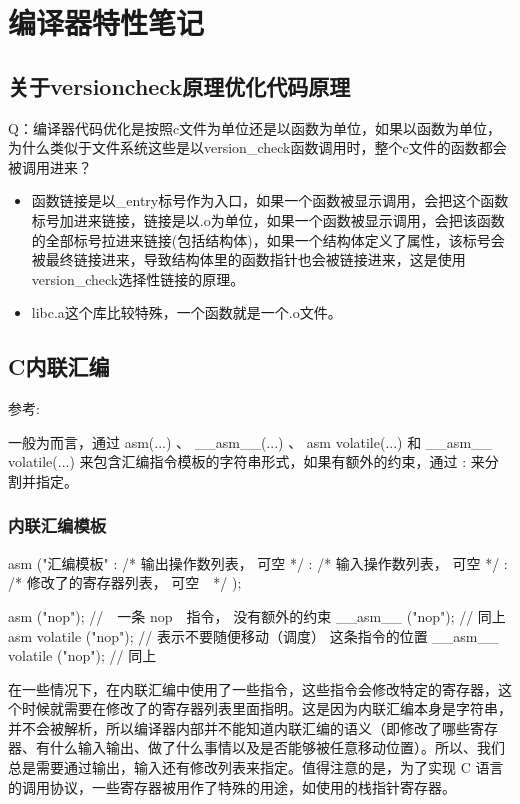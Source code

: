 \section{编译器特性笔记}
\subsection{关于versioncheck原理优化代码原理}
Q：编译器代码优化是按照c文件为单位还是以函数为单位，如果以函数为单位，为什么类似于文件系统这些是以version\_check函数调用时，整个c文件的函数都会被调用进来？
\begin{itemize}
\item 函数链接是以\_entry标号作为入口，如果一个函数被显示调用，会把这个函数标号加进来链接，链接是以.o为单位，如果一个函数被显示调用，会把该函数的全部标号拉进来链接(包括结构体)，如果一个结构体定义了属性，该标号会被最终链接进来，导致结构体里的函数指针也会被链接进来，这是使用version\_check选择性链接的原理。

\item libc.a这个库比较特殊，一个函数就是一个.o文件。


\end{itemize}

\subsection{C内联汇编}
参考: 

一般为而言，通过 asm(...) 、 \_\_asm\_\_(...) 、 asm volatile(...) 和 \_\_asm\_\_ volatile(...) 来包含汇编指令模板的字符串形式，如果有额外的约束，通过 : 来分割并指定。
\subsubsection{内联汇编模板}
\begin{myccode}
asm ("汇编模板"
 : /* 输出操作数列表， 可空 */
 : /* 输入操作数列表， 可空 */
 : /* 修改了的寄存器列表， 可空 */
 );

asm ("nop"); // 一条 nop 指令， 没有额外的约束
__asm__ ("nop"); // 同上
 asm volatile ("nop"); // 表示不要随便移动（调度） 这条指令的位置
__asm__ volatile ("nop"); // 同上
\end{myccode}

在一些情况下，在内联汇编中使用了一些指令，这些指令会修改特定的寄存器，这个时候就需要在修改了的寄存器列表里面指明。这是因为内联汇编本身是字符串，并不会被解析，所以编译器内部并不能知道内联汇编的语义（即修改了哪些寄存器、有什么输入输出、做了什么事情以及是否能够被任意移动位置）。所以、我们总是需要通过输出，输入还有修改列表来指定。值得注意的是，为了实现 C 语言的调用协议，一些寄存器被用作了特殊的用途，如使用的栈指针寄存器。

